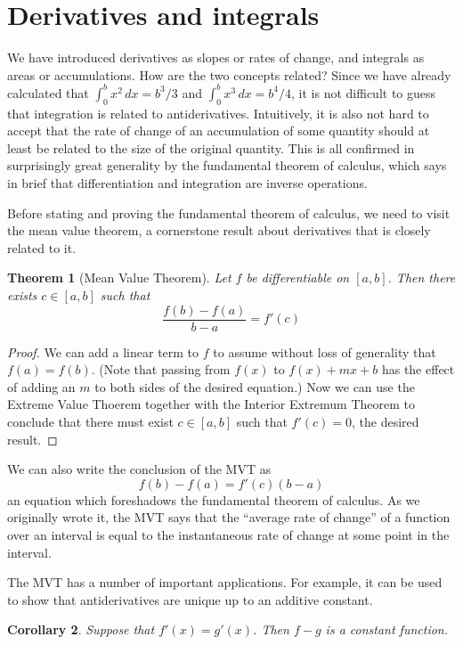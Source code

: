 \documentclass[11pt,oneside]{amsbook}
\theoremstyle{definition}
\theoremstyle{plain}
\newtheorem{thm}{Theorem}[section]
\newtheorem{cor}[thm]{Corollary}
\theoremstyle{definition}
\theoremstyle{remark}
\numberwithin{equation}{section}
\numberwithin{figure}{section}
\begin{document}
\section{Derivatives and integrals}

We have introduced derivatives as slopes or rates of change, and integrals as areas or accumulations. How are the two concepts related? Since we have already calculated that $\int_0^b x^2\,dx=b^3/3$ and $\int_0^b x^3\,dx=b^4/4$, it is not difficult to guess that integration is related to antiderivatives. Intuitively, it is also not hard to accept that the rate of change of an accumulation of some quantity should at least be related to the size of the original quantity. This is all confirmed in surprisingly great generality by the fundamental theorem of calculus, which says in brief that differentiation and integration are inverse operations.

Before stating and proving the fundamental theorem of calculus, we need to visit the mean value theorem, a cornerstone result about derivatives that is closely related to it.

\begin{thm}[Mean Value Theorem]
  Let $f$ be differentiable on $[a,b]$. Then there exists $c\in[a,b]$ such that
  \[\frac{f(b)-f(a)}{b-a}=f'(c)
  \]
\end{thm}

\begin{proof}
  We can add a linear term to $f$ to assume without loss of generality that $f(a)=f(b)$. (Note that passing from $f(x)$ to $f(x)+mx+b$ has the effect of adding an $m$ to both sides of the desired equation.) Now we can use the Extreme Value Thoerem together with the Interior Extremum Theorem to conclude that there must exist $c\in[a,b]$ such that $f'(c)=0$, the desired result.
\end{proof}

We can also write the conclusion of the MVT as
\[f(b)-f(a)=f'(c)(b-a)
\]
an equation which foreshadows the fundamental theorem of calculus. As we originally wrote it, the MVT says that the ``average rate of change'' of a function over an interval is equal to the instantaneous rate of change at some point in the interval.

The MVT has a number of important applications. For example, it can be used to show that antiderivatives are unique up to an additive constant.

\begin{cor}
  Suppose that $f'(x)=g'(x)$. Then $f-g$ is a constant function.
\end{cor}
\end{document}
